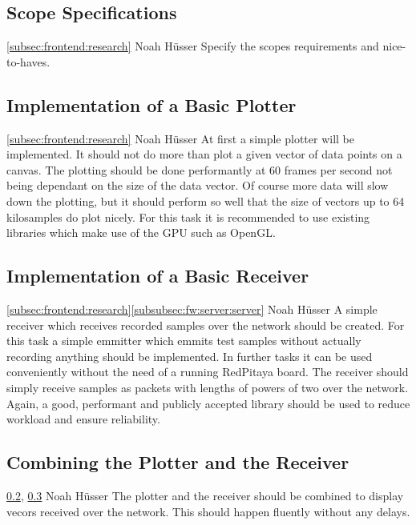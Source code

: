 \documentclass[a4paper,oneside]{alpenspecs/alpenspecs}
\begin{document}
\subsection{Scope Specifications}
\label{subsec:frontend:specify}
\wpac
    {}
    {}
    {}
    {\ref{subsec:frontend:research}}
    {}
    {Noah Hüsser}
    {%
        Specify the scopes requirements and nice-to-haves.
    }

\subsection{Implementation of a Basic Plotter}
\label{subsec:frontend:plotter}
\wpac
    {}
    {}
    {}
    {\ref{subsec:frontend:research}}
    {}
    {Noah Hüsser}
    {%
        At first a simple plotter will be implemented. It should not do more than plot a given vector of data points on a canvas.
        The plotting should be done performantly at 60 frames per second not being dependant on the size of the data vector.
        Of course more data will slow down the plotting, but it should perform so well that the size of vectors up to 64 kilosamples do plot nicely.
        For this task it is recommended to use existing libraries which make use of the GPU such as OpenGL.
    }

\subsection{Implementation of a Basic Receiver}
\label{subsec:frontend:receiver}
\wpac
    {}
    {}
    {}
    {\ref{subsec:frontend:research}\ref{subsubsec:fw:server:server}}
    {}
    {Noah Hüsser}
    {%
        A simple receiver which receives recorded samples over the network should be created.
        For this task a simple emmitter which emmits test samples without actually recording anything should be implemented.
        In further tasks it can be used conveniently without the need of a running RedPitaya board.
        The receiver should simply receive samples as packets with lengths of powers of two over the network.
        Again, a good, performant and publicly accepted library should be used to reduce workload and ensure reliability.
    }

\subsection{Combining the Plotter and the Receiver}
\label{subsec:frontend:combining}
\wpac
    {}
    {}
    {}
    {\ref{subsec:frontend:plotter}, \ref{subsec:frontend:receiver}}
    {}
    {Noah Hüsser}
    {%
        The plotter and the receiver should be combined to display vecors received over the network.
        This should happen fluently without any delays.
    }
\end{document}
